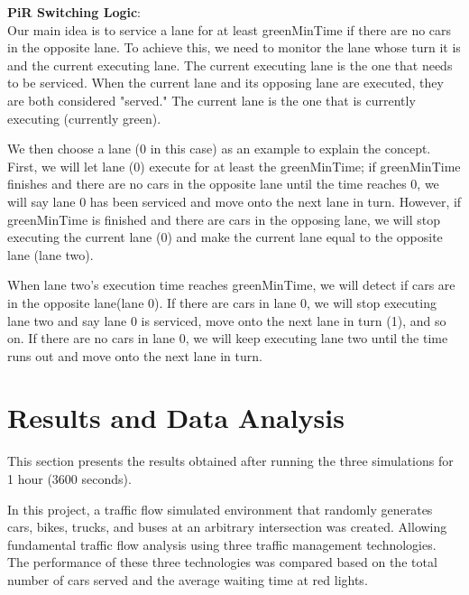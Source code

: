 \documentclass[12pt, a4paper,titlepage]{article}
\begin{document}
\textbf{PiR Switching Logic}:\\

Our main idea is to service a lane for at least greenMinTime if there are no cars in the opposite lane. To achieve this, we need to monitor the lane whose turn it is and the current executing lane. The current executing lane is the one that needs to be serviced. When the current lane and its opposing lane are executed, they are both considered "served." The current lane is the one that is currently executing (currently green).

We then choose a lane (0 in this case) as an example to explain the concept. First, we will let lane (0) execute for at least the greenMinTime; if greenMinTime finishes and there are no cars in the opposite lane until the time reaches 0, we will say lane 0 has been serviced and move onto the next lane in turn. However, if greenMinTime is finished and there are cars in the opposing lane, we will stop executing the current lane (0) and make the current lane equal to the opposite lane (lane two). 

When lane two's execution time reaches greenMinTime, we will detect if cars are in the opposite lane(lane 0). If there are cars in lane 0, we will stop executing lane two and say lane 0 is serviced, move onto the next lane in turn (1), and so on. If there are no cars in lane 0, we will keep executing lane two until the time runs out and move onto the next lane in turn.

\newpage
\section{Results and Data Analysis}
\label{sec_results}

This section presents the results obtained after running the three simulations for 1 hour (3600 seconds).

In this project, a traffic flow simulated environment that randomly generates cars, bikes, trucks, and buses at an arbitrary intersection was created. Allowing fundamental traffic flow analysis using three traffic management technologies. The performance of these three technologies was compared based on the total number of cars served and the average waiting time at red lights.
\end{document}

